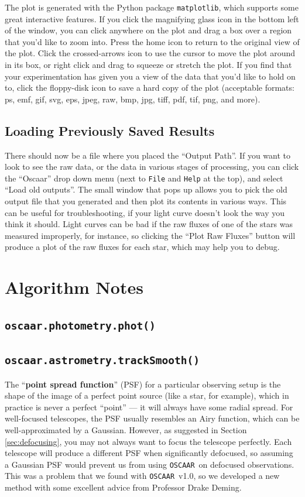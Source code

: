 \documentclass[a4paper]{article}
\newcommand{\code}[1]{\texttt{#1}}
\newcommand{\oscaar}{\code{OSCAAR}~}
\begin{document}
The plot is generated with the Python package \code{matplotlib}, which supports some great interactive features. If you click the magnifying glass icon in the bottom left of the window, you can click anywhere on the plot and drag a box over a region that you'd like to zoom into. Press the home icon to return to the original view of the plot. Click the crossed-arrows icon to use the cursor to move the plot around in its box, or right click and drag to squeeze or stretch the plot. If you find that your experimentation has given you a view of the data that you'd like to hold on to, click the floppy-disk icon to save a hard copy of the plot (acceptable formats: ps, emf, gif, svg, eps, jpeg, raw, bmp, jpg, tiff, pdf, tif, png, and more). 


\subsection{Loading Previously Saved Results}
There should now be a file where you placed the ``Output Path''. If you want to look to see the raw data, or the data in various stages of processing, you can click the ``Oscaar'' drop down menu (next to \code{File} and \code{Help} at the top), and select ``Load old outputs''. The small window that pops up allows you to pick the old output file that you generated and then plot its contents in various ways. This can be useful for troubleshooting, if your light curve doesn't look the way you think it should. Light curves can be bad if the raw fluxes of one of the stars was measured improperly, for instance, so clicking the ``Plot Raw Fluxes'' button will produce a plot of the raw fluxes for each star, which may help you to debug. 

\section{Algorithm Notes} \label{sec:algorithmNotes}
\subsection{\code{oscaar.photometry.phot()}}


\subsection{\code{oscaar.astrometry.trackSmooth()}} \label{sec:trackSmooth}
The ``\textbf{point spread function}'' (PSF) for a particular observing setup is the shape of the image of a perfect point source (like a star, for example), which in practice is never a perfect ``point'' --- it will always have some radial spread. For well-focused telescopes, the PSF usually resembles an Airy function, which can be well-approximated by a Gaussian. However, as suggested in Section \ref{sec:defocusing}, you may not always want to focus the telescope perfectly. Each telescope will produce a different PSF when significantly defocused, so assuming a Gaussian PSF would prevent us from using \oscaar on defocused observations. This was a problem that we found with \oscaar v1.0, so we developed a new method with some excellent advice from Professor Drake Deming.
\end{document}
